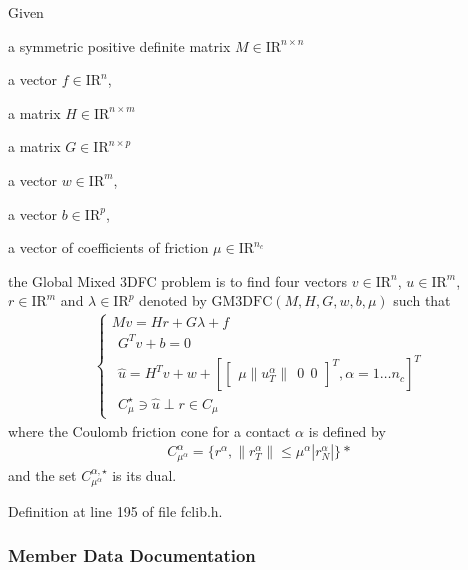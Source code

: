 Given 
\begin{DoxyItemize}
\item a symmetric positive definite matrix ${M} \in {\mathrm{I\!R}}^{n \times n}$ 
\item a vector $ {f} \in {\mathrm{I\!R}}^n$, 
\item a matrix ${H} \in {\mathrm{I\!R}}^{n \times m}$ 
\item a matrix ${G} \in {\mathrm{I\!R}}^{n \times p}$ 
\item a vector $w \in {\mathrm{I\!R}}^{m}$, 
\item a vector $b \in {\mathrm{I\!R}}^{p}$, 
\item a vector of coefficients of friction $\mu \in {\mathrm{I\!R}}^{n_c}$ 
\end{DoxyItemize}the Global Mixed 3\+D\+FC problem is to find four vectors $ {v} \in {\mathrm{I\!R}}^n$, $u\in{\mathrm{I\!R}}^m$, $r\in {\mathrm{I\!R}}^m$ and $\lambda \in {\mathrm{I\!R}}^p$ denoted by $\mathrm{GM3DFC}(M,H,G,w,b,\mu)$ such that \begin{eqnarray*} \begin{cases} M v = {H} {r} + G\lambda + {f} \\ \ \ G^T v +b =0 \\ \ \ \hat u = H^T v + w +\left[ \left[\begin{array}{c} \mu \|u^\alpha_T\|\ \ 0 \ \ 0 \end{array}\right]^T, \alpha = 1 \ldots n_c \right]^T \\ \ \ C^\star_{\mu} \ni {\hat u} \perp r \in C_{\mu} \end{cases} \end{eqnarray*} where the Coulomb friction cone for a contact $\alpha$ is defined by \begin{eqnarray*} \label{eq:CCC} C_{\mu^\alpha}^{\alpha} = \{r^\alpha, \|r^\alpha_T \| \leq \mu^\alpha |r^\alpha_N| \} *\end{eqnarray*} and the set $C^{\alpha,\star}_{\mu^\alpha}$ is its dual. 

Definition at line 195 of file fclib.\+h.



\subsubsection{Member Data Documentation}
\mbox{\label{structfclib__global_a82538cefd07d0f1f6c1e7baebe768fc6}} 
